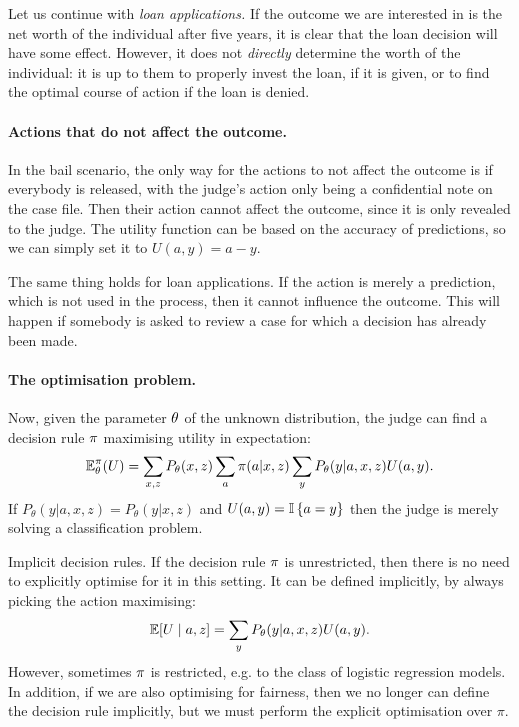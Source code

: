 \begin{frame}
{    Let us continue with \emph{loan applications.} If the outcome we are
    interested in is the net worth of the individual after five years,
    it is clear that the loan decision will have some effect. However,
    it does not \emph{directly} determine the worth of the individual:
    it is up to them to properly invest the loan, if it is given, or
    to find the optimal course of action if the loan is denied.

    \paragraph{Actions that do not affect the outcome.} In the bail
    scenario, the only way for the actions to not affect the outcome
    is if everybody is released, with the judge's action only being a
    confidential note on the case file. Then their action cannot
    affect the outcome, since it is only revealed to the judge. The
    utility function can be based on the accuracy of predictions, so
    we can simply set it to $U(a,y) = a - y$.

    The same thing holds for loan applications. If the action is
    merely a prediction, which is not used in the process, then it
    cannot influence the outcome. This will happen if somebody is
    asked to review a case for which a decision has already been made.
    
    \paragraph{The optimisation problem.} Now, given the parameter $\theta$ of the unknown distribution, the judge can find a decision rule $\pi$ maximising utility in expectation:
    \begin{equation} 
      \label{eq:expected-utility-judge}
      \mathop{\mbox{\ensuremath{\mathbb{E}}}}\nolimits_\theta^\pi(U) = \sum_{x,z} P_\theta(x, z) \sum_a \pi(a | x, z) \sum_y P_\theta(y | a, x, z) U(a,y).
    \end{equation}
    If $P_\theta(y | a, x, z) =P_\theta(y | x, z)$ and $U(a,y) = \mathop{\mbox{\ensuremath{\mathbb{I}}}}\left\{a = y\right\}$ then the judge is merely solving a classification problem.

    \begin{theoryblock}{Implicit decision rules.}
      If the decision rule $\pi$ is unrestricted, then there is no
      need to explicitly optimise for it in this setting. It can be defined implicitly, by always picking the action maximising:
      \[
        \mathop{\mbox{\ensuremath{\mathbb{E}}}}\nolimits[U \mid a, z] = \sum_y P_\theta(y | a, x, z) U(a,y).
      \]
      However, sometimes $\pi$ is restricted, e.g. to the class of logistic regression models. In addition, if we are also optimising for fairness, then we no longer can define the decision rule implicitly, but we must perform the explicit optimisation over $\pi$.
\end{theoryblock}


}
\end{frame}
